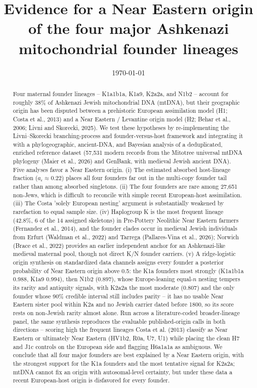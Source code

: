 \documentclass[11pt]{article}
\title{\bfseries Evidence for a Near Eastern origin of the four major Ashkenazi mitochondrial founder lineages}
\author{}
\date{\today}
\begin{document}
\maketitle
\begin{abstract}
Four maternal founder lineages -- K1a1b1a, K1a9, K2a2a, and N1b2 -- account for roughly 38\% of Ashkenazi Jewish mitochondrial DNA (mtDNA), but their geographic origin has been disputed between a prehistoric European assimilation model (H1; Costa et al., 2013) and a Near Eastern / Levantine origin model (H2; Behar et al., 2006; Livni and Skorecki, 2025). We test these hypotheses by re-implementing the Livni--Skorecki branching-process and founder-versus-host framework and integrating it with a phylogeographic, ancient-DNA, and Bayesian analysis of a deduplicated, enriched reference dataset (57,531 modern records from the Mitotree universal mtDNA phylogeny (Maier et al., 2026) and GenBank, with medieval Jewish ancient DNA). Five analyses favor a Near Eastern origin. (i) The estimated absorbed host-lineage fraction ($a_\epsilon \approx 0.22$) places all four founders far out in the multi-copy founder tail rather than among absorbed singletons. (ii) The four founders are rare among 27,651 non-Jews, which is difficult to reconcile with simple recent European-host assimilation. (iii) The Costa 'solely European nesting' argument is substantially weakened by rarefaction to equal sample size. (iv) Haplogroup K is the most frequent lineage (42.8\%, 6 of the 14 assigned skeletons) in Pre-Pottery Neolithic Near Eastern farmers (Fernandez et al., 2014), and the founder clades occur in medieval Jewish individuals from Erfurt (Waldman et al., 2022) and Tarrega (Pallares-Vina et al., 2026); Norwich (Brace et al., 2022) provides an earlier independent anchor for an Ashkenazi-like medieval maternal pool, though not direct K/N founder carriers. (v) A ridge-logistic origin synthesis on standardized data channels assigns every founder a posterior probability of Near Eastern origin above 0.5: the K1a founders most strongly (K1a1b1a 0.988, K1a9 0.994), then N1b2 (0.897), whose Europe-leaning equal-$n$ nesting tempers its rarity and antiquity signals, with K2a2a the most moderate (0.807) and the only founder whose 90\% credible interval still includes parity -- it has no usable Near Eastern sister pool within K2a and no Jewish carrier dated before 1800, so its score rests on non-Jewish rarity almost alone. Run across a literature-coded broader-lineage panel, the same synthesis reproduces the evaluable published-origin calls in both directions -- scoring high the frequent lineages Costa et al. (2013) classify as Near Eastern or ultimately Near Eastern (HV1b2, R0a, U7, U1) while placing the clean H7 and J1c controls on the European side and flagging H6a1a1a as ambiguous. We conclude that all four major founders are best explained by a Near Eastern origin, with the strongest support for the K1a founders and the most tentative signal for K2a2a; mtDNA cannot fix an origin with autosomal-level certainty, but under these data a recent European-host origin is disfavored for every founder.
\end{abstract}
\end{document}
